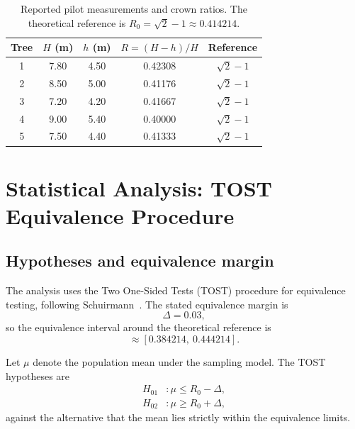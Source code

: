 \documentclass[11pt,a4paper]{article}
\begin{document}
\begin{table}[H]
\centering
\small
\begin{tabular}{ccccc}
\toprule
Tree & \(H\) (m) & \(h\) (m) & \(R=(H-h)/H\) & Reference\\
\midrule
1 & 7.80 & 4.50 & 0.42308 & \(\sqrt{2}-1\)\\
2 & 8.50 & 5.00 & 0.41176 & \(\sqrt{2}-1\)\\
3 & 7.20 & 4.20 & 0.41667 & \(\sqrt{2}-1\)\\
4 & 9.00 & 5.40 & 0.40000 & \(\sqrt{2}-1\)\\
5 & 7.50 & 4.40 & 0.41333 & \(\sqrt{2}-1\)\\
\bottomrule
\end{tabular}
\caption{Reported pilot measurements and crown ratios.
The theoretical reference is
\(R_0=\sqrt{2}-1\approx0.414214\).}
\label{tab:raw_data}
\end{table}

\section{Statistical Analysis: TOST Equivalence Procedure}

\subsection{Hypotheses and equivalence margin}

The analysis uses the Two One-Sided Tests (TOST) procedure
for equivalence testing, following Schuirmann~\cite{schuirmann1987}.
The stated equivalence margin is
\begin{equation}
    \Delta=0.03,
\end{equation}
so the equivalence interval around the theoretical reference
is
\begin{equation}
    [R_0-\Delta,\ R_0+\Delta]
    \approx[0.384214,\ 0.444214].
    \label{eq:equivalence_bounds}
\end{equation}

Let \(\mu\) denote the population mean under the sampling model.
The TOST hypotheses are
\begin{align}
    H_{01}&:\mu\leq R_0-\Delta,\\
    H_{02}&:\mu\geq R_0+\Delta,
\end{align}
against the alternative that the mean lies strictly within
the equivalence limits.
\end{document}

